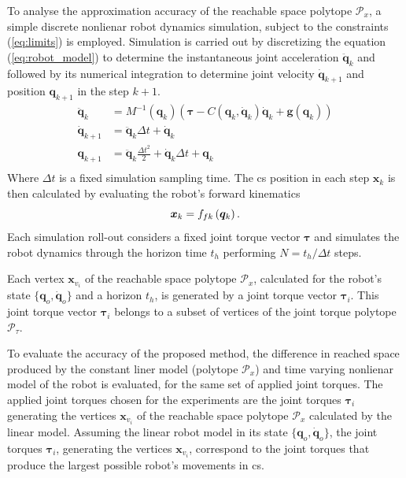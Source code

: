 To analyse the approximation accuracy of the  reachable space polytope $\mathcal{P}_x$, a simple discrete nonlienar robot dynamics simulation, subject to the constraints (\ref{eq:limits}) is employed. Simulation is carried out by discretizing the equation (\ref{eq:robot_model}) to determine the instantaneous joint acceleration $\ddot{\bm{q}}_{k}$ and followed by its numerical integration to determine joint velocity $\dot{\bm{q}}_{k+1}$ and position $\bm{q}_{k+1}$ in the step $k\!+\!1$. 
\begin{equation}
\begin{split}
    \ddot{\bm{q}}_{k} &= M^{-1}(\bm{q}_k)\left(\bm{\tau} - C(\bm{q}_k,\dot{\bm{q}}_k)\dot{\bm{q}}_k + \bm{g}(\bm{q}_k)\right)\\
    \dot{\bm{q}}_{k+1} &= \ddot{\bm{q}}_k\Delta t + \dot{\bm{q}}_{k}\\
    \bm{q}_{k+1} &= \ddot{\bm{q}}_k\frac{\Delta t^2}{2} + \dot{\bm{q}}_k\Delta t  + \bm{q}_{k}\\
\end{split}
\label{eq:simulation_imp}
\end{equation}
Where $\Delta t$ is a fixed simulation sampling time. The \gls{cs} position in each step $\bm{x}_{k}$ is then calculated by evaluating the  robot's forward kinematics
\begin{equation}
    \bm{x}_{k} =f_{fk}\left(\bm{q}_{k}\right).
\end{equation}
Each simulation roll-out considers a fixed joint torque vector $\bm{\tau}$ and simulates the robot dynamics through the horizon time $t_h$ performing $N= t_h/\Delta t$ steps.

Each vertex $\bm{x}_{v_i}$ of the reachable space polytope $\mathcal{P}_x$, calculated for the robot's state $\{\bm{q}_o,\dot{\bm{q}}_o\}$ and a horizon $t_h$, is generated by a joint torque vector $\bm{\tau}_i$. This joint torque vector $\bm{\tau}_i$ belongs to a subset of vertices of the joint torque polytope $\mathcal{P}_\tau$. 

To evaluate the accuracy of the proposed method, the difference in reached space produced by the constant liner model (polytope $\mathcal{P}_x$) and time varying nonlienar model of the robot is evaluated, for the same set of applied joint torques. The applied joint torques chosen for the experiments are the joint torques $\bm{\tau}_i$ generating the vertices $\bm{x}_{v_i}$ of the reachable space polytope $\mathcal{P}_x$ calculated by the linear model. Assuming the linear robot model in its state $\{\bm{q}_o,\dot{\bm{q}}_o\}$, the joint torques $\bm{\tau}_i$, generating the vertices $\bm{x}_{v_i}$, correspond to the joint torques that produce the largest possible robot's movements in \gls{cs}.

